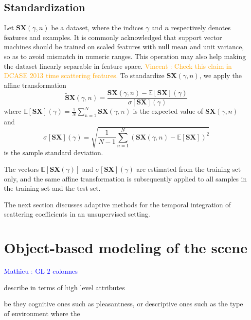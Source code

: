 \documentclass[journal]{IEEEtran}
\newcommand{\vl}[1]{\textcolor{orange}{Vincent : #1}}
\newcommand{\ml}[1]{\textcolor{blue}{ Mathieu : #1}}
\begin{document}
\subsection{Standardization}
Let $\mathbf{S}\boldsymbol{X}(\gamma,n)$ be a dataset, where the indices $\gamma$ and $n$ respectively denotes features and examples.
It is commonly acknowledged that support vector machines should be trained on scaled features with null mean and unit variance, so as to avoid mismatch in numeric ranges.
This operation may also help making the dataset linearly separable in feature space.
\vl{Check this claim in DCASE 2013 time scattering features.}
To standardize $\mathbf{S}\boldsymbol{X}(\gamma,n)$, we apply the affine transformation
\begin{equation}
\widetilde{\mathbf{S}}\boldsymbol{X}(\gamma, n) =
\dfrac{ \mathbf{S}\boldsymbol{X}(\gamma, n) -
\mathbb{E}[ \mathbf{S}\boldsymbol{X}](\gamma)}{\sigma[ \mathbf{S}\boldsymbol{X}](\gamma)}
\end{equation}
where $\mathbb{E}[ \mathbf{S}\boldsymbol{X}](\gamma) = \frac{1}{N} \sum_{n=1}^{N} \mathbf{S}\boldsymbol{X}(\gamma,n)$ is the expected value of $\mathbf{S}\boldsymbol{X}(\gamma,n)$ and
\begin{equation}
\sigma[\mathbf{S}\boldsymbol{X}] (\gamma) =
\sqrt{\frac{1}{N-1} \sum_{n=1}^{N}
\left( \mathbf{S}\boldsymbol{X}(\gamma,n) - \mathbb{E}[\mathbf{S}\boldsymbol{X}] \right)^2}
\end{equation}
 is the sample standard deviation.
 
 The vectors $\mathbb{E}[\mathbf{S}\boldsymbol{X}(\gamma)]$ and $\sigma[\mathbf{S}\boldsymbol{X}](\gamma)$ are estimated from the training set only, and the same affine transformation is subsequently applied to all samples in the training set and the test set.
 
The next section discusses adaptive methods for the temporal integration of scattering coefficients in an unsupervised setting.

\section{Object-based modeling of the scene}

\ml{GL 2 colonnes}

describe in terms of high level attributes

be they cognitive ones such as pleasantness, or descriptive ones such as the type of environment where the 


\end{document}
